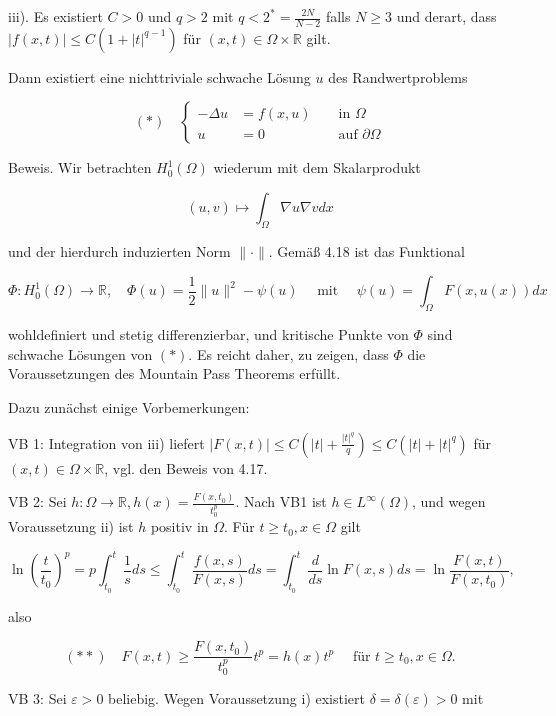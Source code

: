 \documentclass[10pt, letterpaper]{article}
\begin{document}
iii). Es existiert $C>0$ und $q>2$ mit $q<2^{*}=\frac{2 N}{N-2}$ falls $N \geq 3$ und derart, dass $|f(x, t)| \leq C\left(1+|t|^{q-1}\right)$ für $(x, t) \in \Omega \times \mathbb{R}$ gilt.

Dann existiert eine nichttriviale schwache Lösung $u$ des Randwertproblems

$$
(*) \quad\left\{\begin{aligned}
-\Delta u & =f(x, u) & & \text { in } \Omega \\
u & =0 & & \text { auf } \partial \Omega
\end{aligned}\right.
$$

Beweis. Wir betrachten $H_{0}^{1}(\Omega)$ wiederum mit dem Skalarprodukt

$$
(u, v) \mapsto \int_{\Omega} \nabla u \nabla v d x
$$

und der hierdurch induzierten Norm $\|\cdot\|$. Gemäß 4.18 ist das Funktional

$$
\Phi: H_{0}^{1}(\Omega) \rightarrow \mathbb{R}, \quad \Phi(u)=\frac{1}{2}\|u\|^{2}-\psi(u) \quad \text { mit } \quad \psi(u)=\int_{\Omega} F(x, u(x)) d x
$$

wohldefiniert und stetig differenzierbar, und kritische Punkte von $\Phi$ sind schwache Lösungen von $(*)$. Es reicht daher, zu zeigen, dass $\Phi$ die Voraussetzungen des Mountain Pass Theorems erfüllt.

Dazu zunächst einige Vorbemerkungen:

VB 1: Integration von iii) liefert $|F(x, t)| \leq C\left(|t|+\frac{|t|^{q}}{q}\right) \leq C\left(|t|+|t|^{q}\right)$ für $(x, t) \in \Omega \times \mathbb{R}$, vgl. den Beweis von 4.17.

VB 2: Sei $h: \Omega \rightarrow \mathbb{R}, h(x)=\frac{F\left(x, t_{0}\right)}{t_{0}^{p}}$. Nach VB1 ist $h \in L^{\infty}(\Omega)$, und wegen Voraussetzung ii) ist $h$ positiv in $\Omega$. Für $t \geq t_{0}, x \in \Omega$ gilt

$$
\ln \left(\frac{t}{t_{0}}\right)^{p}=p \int_{t_{0}}^{t} \frac{1}{s} d s \leq \int_{t_{0}}^{t} \frac{f(x, s)}{F(x, s)} d s=\int_{t_{0}}^{t} \frac{d}{d s} \ln F(x, s) d s=\ln \frac{F(x, t)}{F\left(x, t_{0}\right)},
$$

also

$$
(* *) \quad F(x, t) \geq \frac{F\left(x, t_{0}\right)}{t_{0}^{p}} t^{p}=h(x) t^{p} \quad \text { für } t \geq t_{0}, x \in \Omega .
$$

VB 3: Sei $\varepsilon>0$ beliebig. Wegen Voraussetzung i) existiert $\delta=\delta(\varepsilon)>0$ mit
\end{document}

